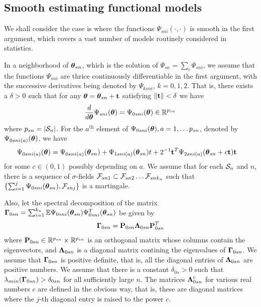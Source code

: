 \subsection{Smooth estimating functional models}

We shall consider the case is where the functions $\Psi_{s n i}  \left( \cdot, \cdot \right)$ is smooth in the first argument, which covers a vast number of models routinely considered in statistics. 
 

In a neighborhood of ${\boldsymbol{\theta}}_{s n}$, which is the solution of $\Psi_{sn} = \sum_i \Psi_{sni}$, we assume that the functions $\Psi_{s n i}$ are thrice continuously differentiable in the first argument, with the successive derivatives being denoted by $\Psi_{k s n i}$, $k = 0, 1, 2$. That is, there exists a $\delta > 0$ such that for any ${\boldsymbol{\theta}} = {\boldsymbol{\theta}}_{s n} + {\bf{t}}$ satisfying $ \| {\bf{t}} \| < \delta$ we have
%
\begin{align} 
{\frac {d}{ d {\boldsymbol{\theta}}}} \Psi_{sn i} ({\boldsymbol{\theta}}) = \Psi_{0 s n i} ({\boldsymbol{\theta}}) \in {\mathbb{R}}^{p_{s n}} 
\end{align} 
%
where $p_{s n} = | {\cal{S}}_n |$. For the $a^\text{th}$ element of $\Psi_{0 s n i} ({\boldsymbol{\theta}}), a = 1, \ldots p_{ s n}$, denoted by $\Psi_{0 s n i (a)} ({\boldsymbol{\theta}})$, we have
%  
\begin{align}
\Psi_{0 s n i (a)} ({\boldsymbol{\theta}}) & = \Psi_{0 s n i (a)} ({\boldsymbol{\theta}}_{s n}) 
	+ \Psi_{1 s n i (a)} ({\boldsymbol{\theta}}_{s n}) t 
		+ 2^{-1}  {\bf{t}}^{T} \Psi_{2 s n i (a)} ({\boldsymbol{\theta}}_{s n} + c {\bf{t}}) {\bf{t}}
\end{align}
%
for some $ c \in (0, 1)$ possibly depending on $a$. We assume that for each ${\cal{S}}_n$ and $n$, there is a sequence of $\sigma$-fields ${\cal{F}}_{ s n 1} \subset {\cal{F}}_{ s n 2} \ldots {\cal{F}}_{ s n k_{n} }$ such that 
$\{ \sum_{i = 1}^{j}  \Psi_{0 s n i } ({\boldsymbol{\theta}}_{s n}), {\cal{F}}_{ s n j} \}$ is a martingale.  

Also, let the spectral decomposition of the matrix 
%
${\boldsymbol{\Gamma}}_{0 s n} =  \sum_{i = 1}^{k_{n}} 
 {\mathbb{E}} \Psi_{0 s n i} ({\boldsymbol{\theta}}_{s n}) \Psi_{0 s n i}^{T} ({\boldsymbol{\theta}}_{s n}) 
$ 
%
be given by
%
\begin{align} 
{\boldsymbol{\Gamma}}_{0 s n}  = {\mathbf{P}}_{0 s n} {\boldsymbol{\Lambda}}_{0 s n} {\mathbf{P}}^{T}_{0 s n} 
\end{align}
%
where ${\mathbf{P}}_{0 s n} \in {\mathbb{R}}^{ p_{ s  n}} \times {\mathbb{R}}^{p_{ s  n}}$ is an orthogonal matrix
whose columns contain the eigenvectors, 
and ${\boldsymbol{\Lambda}}_{0 s n}$ is a diagonal matrix contining the eigenvalues of 
${\boldsymbol{\Gamma}}_{0 s n}$. We assume that ${\boldsymbol{\Gamma}}_{0 s n}$ is positive 
definite, that is, all the diagonal entries of ${\boldsymbol{\Lambda}}_{0 s n}$ are positive numbers.
We assume that there is a constant $\delta_{0 s } > 0$ such that 
$\lambda_{{min}} ({\boldsymbol{\Gamma}}_{0 s n}) > \delta_{ 0 s n}$ for all sufficiently large $n$.
The matrices ${\boldsymbol{\Lambda}}_{0 s n}^{c}$ for various real numbers $c$ are defined in 
the obvious way, that is, these are diagonal matrices where the $j$-th diagonal 
entry is raised to the power $c$. 

